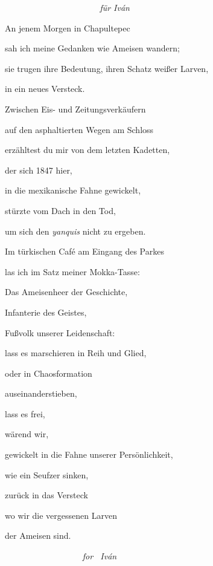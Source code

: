 \bigskip


\bigskip


\bigskip


\emph{
\ \ \ \ \ \ \ \ \ \ \ \ \ \ \ \ \ \ \ \ \ \ für Iván}


\bigskip

An jenem Morgen in Chapultepec

sah ich meine Gedanken wie Ameisen wandern;

sie trugen ihre Bedeutung, ihren Schatz weißer Larven,

in ein neues Versteck.


\bigskip

Zwischen Eis- und Zeitungsverkäufern

auf den asphaltierten Wegen am Schloss 

erzähltest du mir von dem letzten Kadetten, 

der sich 1847 hier, 

in die mexikanische Fahne gewickelt,

stürzte vom Dach in den Tod,

um sich den \emph{yanquis} nicht zu ergeben.


\bigskip

Im türkischen Café am Eingang des Parkes

las ich im Satz meiner Mokka-Tasse: 


\bigskip

Das Ameisenheer der Geschichte,

Infanterie des Geistes,

Fußvolk unserer Leidenschaft:

lass es marschieren in Reih und Glied,

oder in Chaosformation

auseinanderstieben,

lass es frei,


\bigskip

wärend wir,

gewickelt in die Fahne unserer Persönlichkeit,

wie ein Seufzer sinken, 

zurück in das Versteck 

wo wir die vergessenen Larven

der Ameisen sind.


\emph{
\ \ \ \ \ \ \ \ \ \ \ \ \ \ \ \ \ \ for \ Iván}


